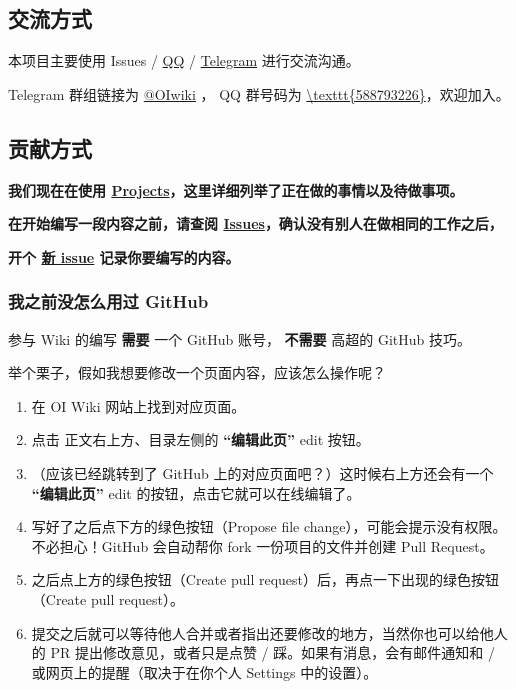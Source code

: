
\subsection{交流方式}

本项目主要使用 Issues / \href{https://jq.qq.com/?_wv=1027&k=5EfkM6K}{QQ} / \href{https://t.me/OIwiki}{Telegram} 进行交流沟通。

Telegram 群组链接为 \href{https://t.me/OIwiki}{@OIwiki} ， QQ 群号码为 \href{https://jq.qq.com/?_wv=1027&k=5EfkM6K}{\textbackslash{}texttt\{588793226\}}，欢迎加入。

\subsection{贡献方式}

\textbf{我们现在在使用 \href{https://github.com/24OI/OI-wiki/projects}{Projects}，这里详细列举了正在做的事情以及待做事项。}

\textbf{在开始编写一段内容之前，请查阅 \href{https://github.com/24OI/OI-wiki/issues}{Issues}，确认没有别人在做相同的工作之后，}

\textbf{开个 \href{https://github.com/24OI/OI-wiki/issues/new}{新 issue} 记录你要编写的内容。}

\subsubsection{我之前没怎么用过 GitHub}

参与 Wiki 的编写 \textbf{ 需要 } 一个 GitHub 账号， \textbf{ 不需要 } 高超的 GitHub 技巧。

举个栗子，假如我想要修改一个页面内容，应该怎么操作呢？

\begin{enumerate}
\item 在 OI Wiki 网站上找到对应页面。
\item 点击 正文右上方、目录左侧的 \textbf{“编辑此页”} edit 按钮。
\item （应该已经跳转到了 GitHub 上的对应页面吧？）这时候右上方还会有一个 \textbf{“编辑此页”} edit 的按钮，点击它就可以在线编辑了。
\item 写好了之后点下方的绿色按钮（Propose file change），可能会提示没有权限。不必担心！GitHub 会自动帮你 fork 一份项目的文件并创建 Pull Request。
\item 之后点上方的绿色按钮（Create pull request）后，再点一下出现的绿色按钮（Create pull request）。
\item 提交之后就可以等待他人合并或者指出还要修改的地方，当然你也可以给他人的 PR 提出修改意见，或者只是点赞 / 踩。如果有消息，会有邮件通知和 / 或网页上的提醒（取决于在你个人 Settings 中的设置）。
\end{enumerate}


